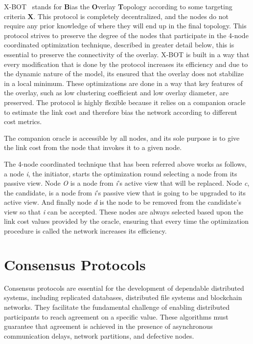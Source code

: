 X-BOT~\cite{xbot} stands for \textbf{B}ias the \textbf{O}verlay \textbf{T}opology
according to some targeting criteria \textbf{X}. This protocol is completely decentralized,
and the nodes do not require any prior knowledge of where they will end up in the final topology. 
This protocol strives to preserve the degree of the nodes that participate in the 4-node coordinated
optimization technique, described in greater detail below, this is essential to preserve
the connectivity of the overlay. X-BOT is built in a way that every modification that is
done by the protocol increases its efficiency and due to the dynamic nature of the model,
its ensured that the overlay does not stabilize in a local minimum. These optimizations
are done in a way that key features of the overlay, such as low clustering coefficient and
low overlay diameter, are preserved. The protocol is highly flexible because it relies on a
companion oracle to estimate the link cost and therefore bias the network according to
different cost metrics.

The companion oracle is accessible by all nodes, and its sole purpose is to give the
link cost from the node that invokes it to a given node.

The 4-node coordinated technique that has been referred above works as follows, a
node \textit{i}, the initiator, starts the optimization round selecting a node from
its passive view. Node \textit{O} is a node from \textit{i}'s active view that
will be replaced. Node \textit{c}, the candidate, is a node from \textit{i}'s passive
view that is going to be upgraded to its active view. And finally node \textit{d}
is the node to be removed from the candidate's view so that \textit{i} can be accepted.
These nodes are always selected based upon the link cost values provided by the oracle,
ensuring that every time the optimization procedure is called the network increases its
efficiency.

\section{Consensus Protocols}\label{sec:consensus}

Consensus protocols are essential for the development of dependable distributed systems,
including replicated databases, distributed file systems and blockchain networks. They facilitate
the fundamental challenge of enabling distributed participants to reach agreement on a specific value.
These algorithms must guarantee that agreement is achieved in the presence of asynchronous communication
delays, network partitions, and defective nodes.

